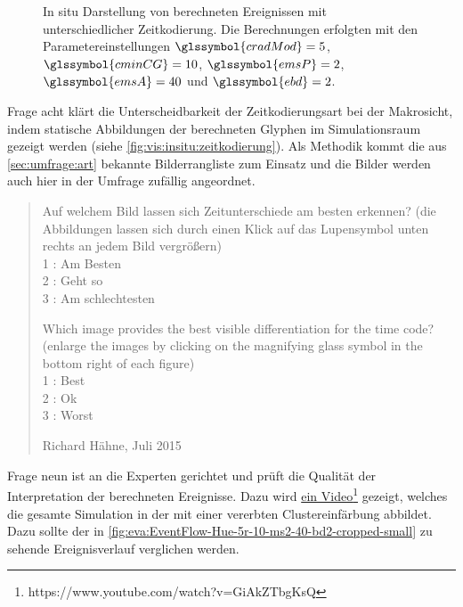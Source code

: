 \begin{figure}
	{\caption{In situ Darstellung von berechneten Ereignissen mit unterschiedlicher Zeitkodierung. Die Berechnungen erfolgten mit den Parametereinstellungen $\glssymbol{cradMod} = 5$, $\glssymbol{cminCG} = 10$,  $\glssymbol{emsP} = 2$,  $\glssymbol{emsA} = 40$ und $\glssymbol{ebd} = 2$.}\label{fig:vis:insitu:zeitkodierung}}
\end{figure}

Frage acht klärt die Unterscheidbarkeit der Zeitkodierungsart bei der Makrosicht, indem statische Abbildungen der berechneten Glyphen im Simulationsraum gezeigt werden (siehe \autoref{fig:vis:insitu:zeitkodierung}). Als Methodik kommt die aus \autoref{sec:umfrage:art} bekannte Bilderrangliste zum Einsatz und die Bilder werden auch hier in der Umfrage zufällig angeordnet.

\blockquote[Richard Hähne, Juli 2015]{
	Auf welchem Bild lassen sich Zeitunterschiede am besten erkennen? (die Abbildungen lassen sich durch einen Klick auf das Lupensymbol unten rechts an jedem Bild vergrößern)\\
	1 : Am Besten\\
	2 : Geht so\\
	3 : Am schlechtesten
	
	Which image provides the best visible differentiation for the time code? (enlarge the images by clicking on the magnifying glass symbol in the bottom right of each figure)\\
	1 : Best\\
	2 : Ok\\
	3 : Worst
	
}

Frage neun ist an die Experten gerichtet und prüft die Qualität der Interpretation der berechneten Ereignisse. Dazu wird \href{https://www.youtube.com/watch?v=GiAkZTbgKsQ}{ein Video}\footnote{https://www.youtube.com/watch?v=GiAkZTbgKsQ} gezeigt, welches die gesamte Simulation in der  mit einer vererbten Clustereinfärbung abbildet. Dazu sollte der in \autoref{fig:eva:EventFlow-Hue-5r-10-ms2-40-bd2-cropped-small} zu sehende Ereignisverlauf verglichen werden.

